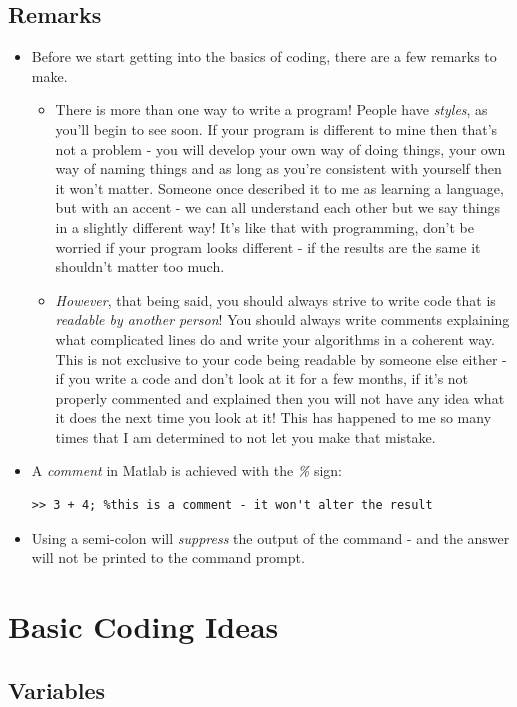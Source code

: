 \documentclass[12pt]{report}
\begin{document}
\subsection*{Remarks}

\begin{itemize}
\item Before we start getting into the basics of coding, there are a few remarks to make.
\begin{itemize}
\item There is more than one way to write a program! People have \textit{styles}, as you'll begin to see soon. If your program is different to mine then that's not a problem - you will develop your own way of doing things, your own way of naming things and as long as you're consistent with yourself then it won't matter. Someone once described it to me as learning a language, but with an accent - we can all understand each other but we say things in a slightly different way! It's like that with programming, don't be worried if your program looks different - if the results are the same it shouldn't matter too much.
\item \textit{However}, that being said, you should always strive to write code that is \textit{readable by another person}! You should always write comments explaining what complicated lines do and write your algorithms in a coherent way. This is not exclusive to your code being readable by someone else either - if you write a code and don't look at it for a few months, if it's not properly commented and explained then you will not have any idea what it does the next time you look at it! This has happened to me so many times that I am determined to not let you make that mistake.
\end{itemize}
\item A \textit{comment} in Matlab is achieved with the \textit{\%} sign:
\begin{lstlisting}
>> 3 + 4; %this is a comment - it won't alter the result
\end{lstlisting} 
\item Using a semi-colon will \textit{suppress} the output of the command - and the answer will not be printed to the command prompt.
\end{itemize}

\section*{Basic Coding Ideas}

\subsection*{Variables}
\end{document}
